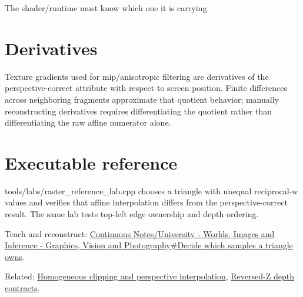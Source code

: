 The shader/runtime must know which one it is carrying.

\section{Derivatives}\label{appendix-1ed5f96c73ea-derivatives}

Texture gradients used for mip/anisotropic filtering are derivatives of the perspective-correct attribute with respect to screen position. Finite differences across neighboring fragments approximate that quotient behavior; manually reconstructing derivatives requires differentiating the quotient rather than differentiating the raw affine numerator alone.

\section{Executable reference}\label{appendix-1ed5f96c73ea-executable-reference}

tools/labs/raster\_reference\_lab.cpp chooses a triangle with unequal reciprocal-w values and verifies that affine interpolation differs from the perspective-correct result. The same lab tests top-left edge ownership and depth ordering.

Teach and reconstruct: \href{Continuous\%20Notes/University\%20-\%20Worlds,\%20Images\%20and\%20Inference\%20-\%20Graphics,\%20Vision\%20and\%20Photography\#Decide\%20which\%20samples\%20a\%20triangle\%20owns}{Continuous Notes/University - Worlds, Images and Inference - Graphics, Vision and Photography\#Decide which samples a triangle owns}.

Related: \hyperref[appendix-40426e4b2103]{Homogeneous clipping and perspective interpolation}, \hyperref[appendix-275ec8847057]{Reversed-Z depth contracts}.
